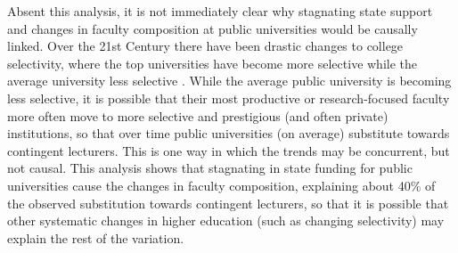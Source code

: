 
Absent this analysis, it is not immediately clear why stagnating state support and changes in faculty composition at public universities would be causally linked.
Over the 21st Century there have been drastic changes to college selectivity, where the top universities have become more selective while the average university less selective \citep{hoxby2009changing}.
While the average public university is becoming less selective, it is possible that their most productive or research-focused faculty more often move to more selective and prestigious (and often private) institutions, so that over time public universities (on average) substitute towards contingent lecturers. 
This is one way in which the trends may be concurrent, but not causal.
This analysis shows that stagnating in state funding for public universities cause the changes in faculty composition, explaining about 40\% of the observed substitution towards contingent lecturers, so that it is possible that other systematic changes in higher education (such as changing selectivity) may explain the rest of the variation.

